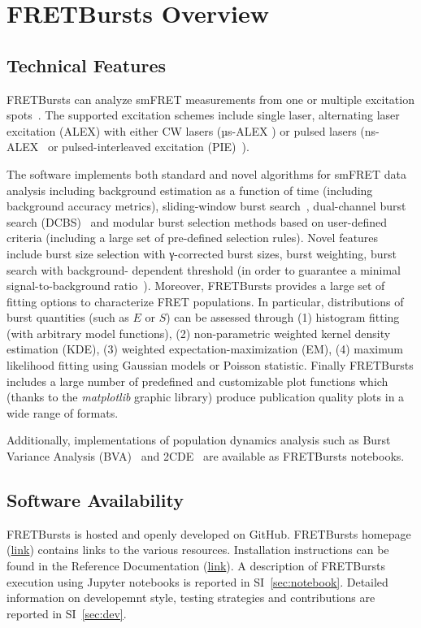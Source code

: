\section{FRETBursts Overview}
\label{sec:overview}

\subsection{Technical Features}

FRETBursts can analyze smFRET measurements
from one or multiple excitation spots~\cite{Ingargiola_2013}. The supported
excitation schemes include single laser, alternating laser excitation (ALEX)
with either CW lasers (µs-ALEX \cite{Kapanidis_2005})
or pulsed lasers (ns-ALEX~\cite{Laurence_2005} or
pulsed-interleaved excitation (PIE)~\cite{M_ller_2005}).

The software implements both standard and novel algorithms for smFRET data analysis
including background estimation as a function of time (including background accuracy
metrics), sliding-window burst search~\cite{Eggeling_1998}, 
dual-channel burst search (DCBS)~\cite{Nir_2006} and
modular burst selection methods based on user-defined criteria
(including a large set of pre-defined selection rules). Novel features include burst size
selection with γ-corrected burst sizes, burst weighting, burst search with background-
dependent threshold (in order to guarantee a minimal signal-to-background 
ratio~\cite{Michalet_2012}).
Moreover, FRETBursts provides a large set of fitting options to characterize FRET populations. 
In particular, distributions of burst quantities (such as $E$ or $S$) can be assessed
through (1) histogram fitting (with arbitrary model functions),
(2) non-parametric weighted kernel density estimation (KDE), (3) weighted
expectation-maximization (EM), (4) maximum likelihood fitting using Gaussian models
or Poisson statistic. Finally FRETBursts includes a large number of
predefined and customizable plot functions which (thanks to the \textit{matplotlib}
graphic library) produce publication quality plots in a wide range of formats.

Additionally, implementations of population dynamics analysis such 
as Burst Variance Analysis (BVA)~\cite{Torella_2011} and 2CDE~\cite{Tomov_2012} 
are available as FRETBursts notebooks.

\subsection{Software Availability}
FRETBursts is hosted and openly developed on GitHub. FRETBursts homepage 
(\href{http://tritemio.github.io/FRETBursts}{link})
contains links to the various resources. Installation instructions can be found in the
Reference Documentation (\href{http://fretbursts.readthedocs.org/en/latest/getting_started.html}{link}). 
A description of FRETBursts execution using Jupyter notebooks is reported 
in SI~\ref{sec:notebook}.
Detailed information on developemnt style, testing strategies and 
contributions are reported in SI~\ref{sec:dev}.